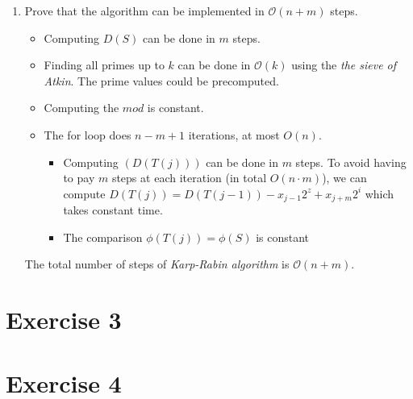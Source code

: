 \documentclass[12pt, a4paper]{article} %
\begin{document}
\begin{enumerate}[label=(\alph*)]
\begin{proof}
        \begin{align*}
          Pr[output match, when no match]& \\
          \leq Pr[p divides X] &= \frac{\#\{prime divisors of X\}}{\pi(k)} \\
                            &\leq  \frac{mn\ln(cmn\ln(mn))}{dcmn\ln(mn)} \\
                            &= \frac{1}{dc} + \frac{\ln(c)}{dc\ln(mn)} + \frac{\ln\ln(m n)}{dc\ln(mn)}
        \end{align*}

        Given a large enough c the right hand side can be made less than any fixed constant by basic calculus.

    \end{proof}


  \item  Prove that the algorithm can be implemented in $\mathcal{O}(n + m)$ steps.

    \begin{itemize}
        \item Computing $D(S)$ can be done in $m$ steps.
        \item Finding all primes up to $k$ can be done in $\mathcal{O}(k)$ using the \textit{the sieve of Atkin}. The prime values could be precomputed.
        \item Computing the $mod$ is constant.
        \item The for loop does $n - m + 1$ iterations, at most $O(n)$.
        \begin{itemize}
          \item Computing $(D(T(j)))$ can be done in $m$ steps. To avoid having to pay $m$ steps at each iteration (in total $O(n \cdot m)$), we can compute $D(T(j)) = D(T(j-1)) - x_{j-1}2^{z} + x_{j+m}2^{i}$  which takes constant time.
          \item The comparison $\phi(T(j)) = \phi(S)$ is constant
        \end{itemize}
    \end{itemize}

    The total number of steps of \textit{Karp-Rabin algorithm} is $\mathcal{O}(n + m)$.

\end{enumerate}



\section*{Exercise 3}%
\label{sec:exercise_3}


\section*{Exercise 4}%
\label{sec:exercise_4}


% 
\end{document}

